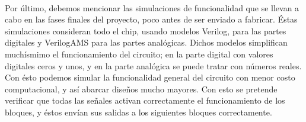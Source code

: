 \paragraph{}
Por último, debemos mencionar las simulaciones de funcionalidad que se llevan
a cabo en las fases finales del proyecto, poco antes de ser enviado a fabricar.
Éstas simulaciones consideran todo el chip, usando modelos Verilog, para las partes
digitales y VerilogAMS para las partes analógicas. Dichos modelos simplifican
muchísmimo el funcionamiento del circuito; en la parte digital con valores
digitales ceros y unos, y en la parte analógica se puede tratar con números reales.
Con ésto podemos simular la funcionalidad general del circuito con menor costo
computacional, y así abarcar diseños mucho mayores. Con esto se pretende verificar
que todas las señales activan correctamente el funcionamiento de los bloques, y éstos
envían sus salidas a los siguientes bloques correctamente.
